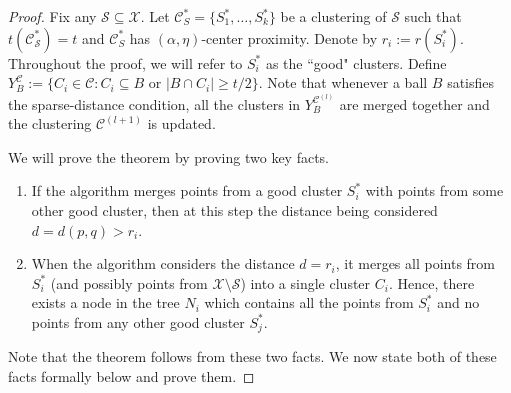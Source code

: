 \documentclass[anon,12pt]{colt2016} %
\newcommand{\mc}{\mathcal}
\begin{document}
\begin{proof}
Fix any $\mc S \subseteq \mc X$. Let $\mc C^*_S = \{S_1^*, \ldots, S_k^*\}$ be a clustering of $\mc S$ such that $t(\mc C_{\mc S}^*) = t$ and $\mc C^*_S$ has $(\alpha, \eta)$-center proximity. Denote by $r_i := r(S_i^*)$. Throughout the proof, we will refer to $S_i^*$ as the ``good" clusters. Define $Y_B^{\mc C} := \{C_i \in \mc C : C_i \subseteq B \text{ or } |B \cap C_i| \ge t/2\}$. Note that whenever a ball $B$ satisfies the sparse-distance condition, all the clusters in $Y_{B}^{{\mc C}^{(l)}}$ are merged together and the clustering $\mc C^{(l+1)}$ is updated.

\noindent We will prove the theorem by proving two key facts.

\begin{enumerate}[nolistsep, noitemsep, label=\textbf{F.\arabic*}]
\renewcommand\labelitemi{$\diamond$}
\item \label{fact:1} If the algorithm merges points from a good cluster $S_i^*$ with points from some other good cluster,  then at this step the distance being considered $d = d(p,q) > r_i$.	
\item \label{fact:2} When the algorithm considers the distance $d = r_i$, it merges all points from $S_i^*$ (and possibly points from $\mc X\setminus \mc S$) into a single cluster $C_i$. Hence, there exists a node in the tree $N_i$ which contains all the points from $S_i^*$ and no points from any other good cluster $S_j^*$. 	
\end{enumerate}
Note that the theorem follows from these two facts. We now state both of these facts formally below and prove them.


\end{proof}
\end{document}
